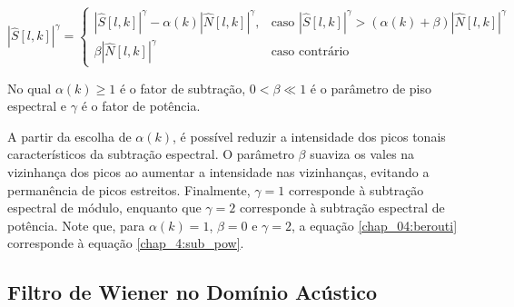 \begin{equation} \label{chap_04:berouti}
    |\hat{S}[l, k]|^\gamma =
    \begin{cases}
        |\hat{S}[l, k]|^\gamma - \alpha(k)|\hat{N}[l, k]|^\gamma, &  \text{caso } |\hat{S}[l, k]|^\gamma > (\alpha(k) + \beta)|\hat{N}[l, k]|^\gamma \\
        \beta|\hat{N}[l, k]|^\gamma&  \text{caso contrário}
    \end{cases}
\end{equation}

No qual $\alpha(k) \geq 1$  é o fator de subtração, $0 < \beta \ll 1 $ é o
parâmetro de piso espectral e $\gamma$ é o fator de potência.

A partir da escolha de $\alpha(k)$, é possível reduzir a intensidade dos picos
tonais característicos da subtração espectral. O parâmetro $\beta$ suaviza os
vales na vizinhança dos picos ao aumentar a intensidade nas vizinhanças,
evitando a permanência de picos estreitos. Finalmente, $\gamma = 1$ corresponde
à subtração espectral de módulo, enquanto que $\gamma = 2$ corresponde à
subtração espectral de potência. Note que, para $\alpha(k) = 1$, $\beta = 0$ e
$\gamma = 2$, a equação \eqref{chap_04:berouti} corresponde à equação
\eqref{chap_4:sub_pow}.


\subsection{Filtro de Wiener no Domínio Acústico}